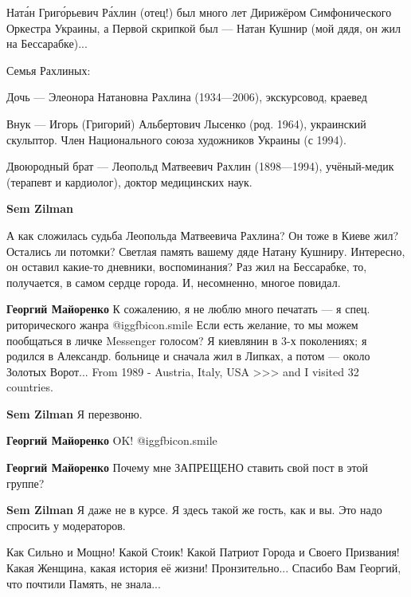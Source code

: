 \begin{itemize}

Ната́н Григо́рьевич Ра́хлин (отец!) был много лет Дирижёром Симфонического
Оркестра Украины, а Первой скрипкой был — Натан Кушнир (мой дядя, он жил на
Бессарабке)...

Семья Рахлиных:

Дочь — Элеонора Натановна Рахлина (1934—2006), экскурсовод, краевед

Внук — Игорь (Григорий) Альбертович Лысенко (род. 1964), украинский скульптор.
Член Национального союза художников Украины (с 1994).

Двоюродный брат — Леопольд Матвеевич Рахлин (1898—1994), учёный-медик (терапевт
и кардиолог), доктор медицинских наук.

\begin{itemize} %
\textbf{Sem Zilman} 

А как сложилась судьба Леопольда Матвеевича Рахлина? Он тоже в Киеве жил?
Остались ли потомки? Светлая память вашему дяде Натану Кушниру. Интересно, он
оставил какие-то дневники, воспоминания? Раз жил на Бессарабке, то, получается,
в самом сердце города. И, несомненно, многое повидал.

\begin{itemize} %
\textbf{Георгий Майоренко} К сожалению, я не люблю много печатать — я спец. риторического жанра  @igg{fbicon.smile} 
Если есть желание, то мы можем пообщаться в личке Messenger голосом?
Я киевлянин в 3-х поколениях; я родился в Александр. больнице и сначала жил в Липках, а потом — около Золотых Ворот... From 1989 - Austria, Italy, USA >>> and I visited 32 countries.

\textbf{Sem Zilman} Я перезвоню.

\textbf{Георгий Майоренко} OK!  @igg{fbicon.smile} 

\textbf{Георгий Майоренко} Почему мне ЗАПРЕЩЕНО ставить свой пост в этой группе?

\textbf{Sem Zilman} Я даже не в курсе. Я здесь такой же гость, как и вы. Это надо спросить у модераторов.
\end{itemize} %

\end{itemize} %


Как Сильно и Мощно! Какой Стоик! Какой Патриот Города и Своего Призвания! Какая
Женщина, какая история её жизни! Пронзительно... Спасибо Вам Георгий, что
почтили Память, не знала...


\end{itemize}

